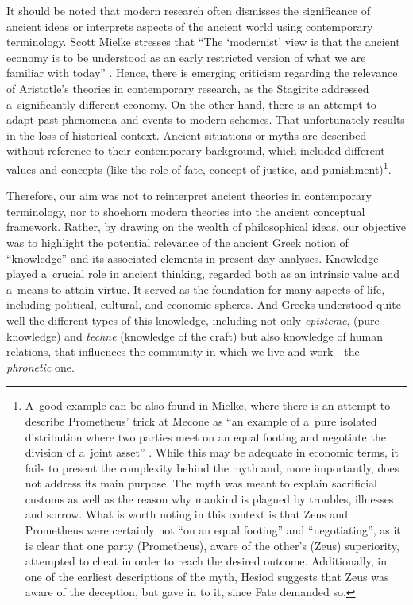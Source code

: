 It should be noted that modern research often dismisses the significance of ancient ideas or interprets aspects of the ancient world using contemporary terminology. Scott Mielke stresses that ``The ‘modernist' view is that the ancient economy is to be understood as an early restricted version of what we are familiar with today'' 
\parencite[][p.2]{meikle_aristotles_1995}. %
 Hence, there is emerging criticism regarding the relevance of Aristotle's theories in contemporary research, as the Stagirite addressed a~significantly different economy. On the other hand, there is an attempt to adapt past phenomena and events to modern schemes. That unfortunately results in the loss of historical context. Ancient situations or myths are described without reference to their contemporary background, which included different values and concepts (like the role of fate, concept of justice, and punishment)\footnote{A~good example can be also found in Mielke, where there is an attempt to describe Prometheus' trick at Mecone as ``an example of a~pure isolated distribution where two parties meet on an equal footing and negotiate the division of a~joint asset'' 
\parencite[][p.178]{meikle_aristotles_1995}. %
 While this may be adequate in economic terms, it fails to present the complexity behind the myth and, more importantly, does not address its main purpose. The myth was meant to explain sacrificial customs as well as the reason why mankind is plagued by troubles, illnesses and sorrow. What is worth noting in this context is that Zeus and Prometheus were certainly not ``on an equal footing'' and ``negotiating'', as it is clear that one party (Prometheus), aware of the other's (Zeus) superiority, attempted to cheat in order to reach the desired outcome. Additionally, in one of the earliest descriptions of the myth, Hesiod suggests that Zeus was aware of the deception, but gave in to it, since Fate demanded so.}.



Therefore, our aim was not to reinterpret ancient theories in contemporary terminology, nor to shoehorn modern theories into the ancient conceptual framework. Rather, by drawing on the wealth of philosophical ideas, our objective was to highlight the potential relevance of the ancient Greek notion of ``knowledge'' and its associated elements in present-day analyses. Knowledge played a~crucial role in ancient thinking, regarded both as an intrinsic value and a~means to attain virtue. It served as the foundation for many aspects of life, including political, cultural, and economic spheres. And Greeks understood quite well the different types of this knowledge, including not only \textit{episteme}, (pure knowledge) and \textit{techne} (knowledge of the craft) but also knowledge of human relations, that influences the community in which we live and work - the \textit{phronetic} one.



